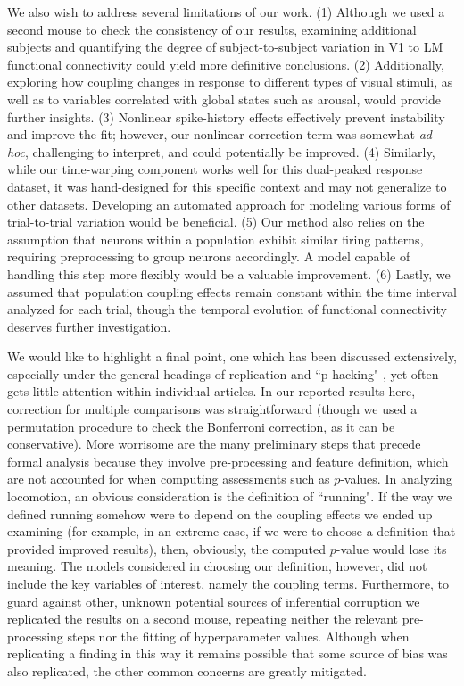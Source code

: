\documentclass[12pt]{article}
\begin{document}
We also wish to address several limitations of our work. (1) Although we used a second mouse to check the consistency of our results, examining additional subjects and quantifying the degree of subject-to-subject variation in V1 to LM functional connectivity could yield more definitive conclusions. (2) Additionally, exploring how coupling changes in response to different types of visual stimuli, as well as to variables correlated with global states such as arousal, would provide further insights. (3) Nonlinear spike-history effects effectively prevent instability and improve the fit; however, our nonlinear correction term was somewhat {\em ad hoc}, challenging to interpret, and could potentially be improved. (4) Similarly, while our time-warping component works well for this dual-peaked response dataset, it was hand-designed for this specific context and may not generalize to other datasets. Developing an automated approach for modeling various forms of trial-to-trial variation would be beneficial. (5) Our method also relies on the assumption that neurons within a population exhibit similar firing patterns, requiring preprocessing to group neurons accordingly. A model capable of handling this step more flexibly would be a valuable improvement. (6) Lastly, we assumed that population coupling effects remain constant within the time interval analyzed for each trial, though the temporal evolution of functional connectivity deserves further investigation.

We would like to highlight a final point, one which has been discussed extensively, especially under the general headings of replication and ``p-hacking" \cite{NAS2019,stefan2023}, yet often gets little attention within individual articles. In our reported results here, correction for multiple comparisons was straightforward (though we used a permutation procedure to check the Bonferroni correction, as it can be conservative). More worrisome are the many preliminary steps that precede formal analysis because they involve pre-processing and feature definition, which are not accounted for when computing assessments such as $p$-values. In analyzing locomotion, an obvious consideration is the definition of ``running". If the way we defined running somehow were to depend on the coupling effects we ended up examining (for example, in an extreme case, if we were to choose a definition that provided improved results), then, obviously, the computed $p$-value would lose its meaning. The models considered in choosing our definition, however, did not include the key variables of interest, namely the coupling terms. Furthermore, to guard against other, unknown potential sources of inferential corruption we replicated the results on a second mouse, repeating neither the relevant pre-processing steps nor the fitting of hyperparameter values. Although when replicating a finding in this way it remains possible that some source of bias was also replicated, the other common concerns are greatly mitigated.
\end{document}
